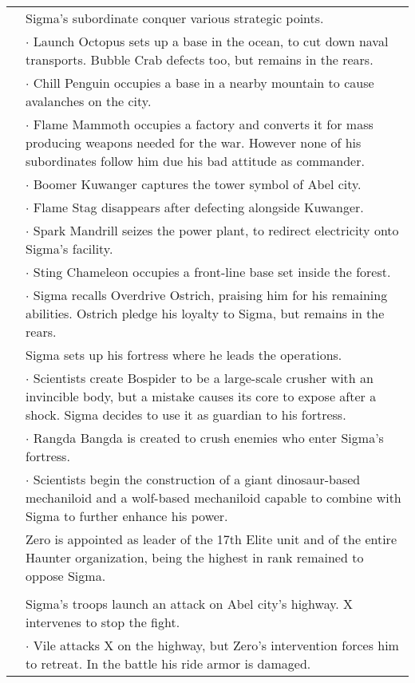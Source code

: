 \begin{tabularx}{\linewidth}{l X}
	\tabdot& Sigma's subordinate conquer various strategic points.\\
	\tabline& $\cdot$ Launch Octopus sets up a base in the ocean, to cut down naval transports. Bubble Crab defects too, but remains in the rears.\\
	\tabline& $\cdot$ Chill Penguin occupies a base in a nearby mountain to cause avalanches on the city.\\
	\tabline& $\cdot$ Flame Mammoth occupies a factory and converts it for mass producing weapons needed for the war. However none of his subordinates follow him due his bad attitude as commander.\\
	\tabline& $\cdot$ Boomer Kuwanger captures the tower symbol of Abel city.\\
	\tabline& $\cdot$ Flame Stag disappears after defecting alongside Kuwanger.\\
	\tabline& $\cdot$ Spark Mandrill seizes the power plant, to redirect electricity onto Sigma's facility.\\
	\tabline& $\cdot$ Sting Chameleon occupies a front-line base set inside the forest.\\
	\tabline& $\cdot$ Sigma recalls Overdrive Ostrich, praising him for his remaining abilities. Ostrich pledge his loyalty to Sigma, but remains in the rears.\\
	\tabdot& Sigma sets up his fortress where he leads the operations.\\
	\tabline& $\cdot$ Scientists create Bospider to be a large-scale crusher with an invincible body, but a mistake causes its core to expose after a shock. Sigma decides to use it as guardian to his fortress.\\
	\tabline& $\cdot$ Rangda Bangda is created to crush enemies who enter Sigma's fortress.\\
	\tabline& $\cdot$ Scientists begin the construction of a giant dinosaur-based mechaniloid and a wolf-based mechaniloid capable to combine with Sigma to further enhance his power.\\
	\tabdot& Zero is appointed as leader of the 17th Elite unit and of the entire Haunter organization, being the highest in rank remained to oppose Sigma.\\
	\midrule
	\rowcolor{Aquamarine}
	\multicolumn{2}{c}{\textbf{Mega Man X}}\\
	\addlinespace[1.5ex]
	\tabdot& Sigma's troops launch an attack on Abel city's highway. X intervenes to stop the fight.\\
	\tabline& $\cdot$ Vile attacks X on the highway, but Zero's intervention forces him to retreat. In the battle his ride armor is damaged.\\

\end{tabularx}
